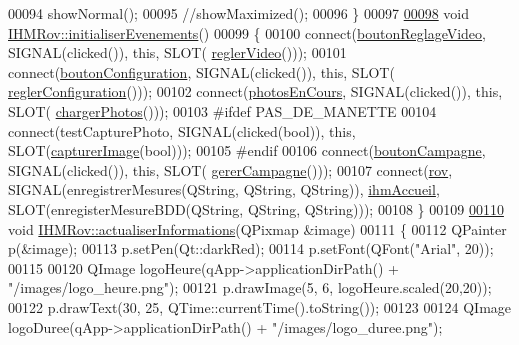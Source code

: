 \begin{DoxyCode}
00094     showNormal();
00095     \textcolor{comment}{//showMaximized();}
00096 \}
00097 
\hyperlink{class_i_h_m_rov_a61e34efc084bba9934bce0d91448ea04}{00098} \textcolor{keywordtype}{void} \hyperlink{class_i_h_m_rov_a61e34efc084bba9934bce0d91448ea04}{IHMRov::initialiserEvenements}()
00099 \{
00100     connect(\hyperlink{class_i_h_m_rov_a57cb3bea4f1f9149d730ccc5688581fc}{boutonReglageVideo}, SIGNAL(clicked()), \textcolor{keyword}{this}, SLOT(
      \hyperlink{class_i_h_m_rov_a68653dfe09dbb9695797d60e9190366b}{reglerVideo}()));
00101     connect(\hyperlink{class_i_h_m_rov_aea67721180bf155892a297b3c39309c5}{boutonConfiguration}, SIGNAL(clicked()), \textcolor{keyword}{this}, SLOT(
      \hyperlink{class_i_h_m_rov_a9b517b4891917634d64c903894bcc48b}{reglerConfiguration}()));
00102     connect(\hyperlink{class_i_h_m_rov_a0896dea1a2d901a7cf43a344e22fc66d}{photosEnCours}, SIGNAL(clicked()), \textcolor{keyword}{this}, SLOT(
      \hyperlink{class_i_h_m_rov_aae5c264f7a1b6d27c1d2e25574c88c5b}{chargerPhotos}()));
00103 \textcolor{preprocessor}{    #ifdef PAS\_DE\_MANETTE}
00104     connect(testCapturePhoto, SIGNAL(clicked(\textcolor{keywordtype}{bool})), \textcolor{keyword}{this}, SLOT(\hyperlink{class_i_h_m_rov_a15fe4fd090a0171bb9ad24e28d3b978a}{capturerImage}(\textcolor{keywordtype}{bool})));
00105 \textcolor{preprocessor}{    #endif}
00106     connect(\hyperlink{class_i_h_m_rov_a324be23537f48127c49b943aa439a978}{boutonCampagne}, SIGNAL(clicked()), \textcolor{keyword}{this}, SLOT(
      \hyperlink{class_i_h_m_rov_a3660d3b4bf61367534eae9d0c3618a5e}{gererCampagne}()));
00107     connect(\hyperlink{class_i_h_m_rov_a777ca33fdb295ba6b6773e880356fa1e}{rov}, SIGNAL(enregistrerMesures(QString, QString, QString)), 
      \hyperlink{class_i_h_m_rov_aa22f6fe8daf5c67071ec02a348e5cc3e}{ihmAccueil}, SLOT(enregisterMesureBDD(QString, QString, QString)));
00108 \}
00109 
\hyperlink{class_i_h_m_rov_a58ba3661c111c9ab2d6f1e3c52f4ec21}{00110} \textcolor{keywordtype}{void} \hyperlink{class_i_h_m_rov_a58ba3661c111c9ab2d6f1e3c52f4ec21}{IHMRov::actualiserInformations}(QPixmap &image)
00111 \{
00112     QPainter p(&image);
00113     p.setPen(Qt::darkRed);
00114     p.setFont(QFont(\textcolor{stringliteral}{"Arial"}, 20));
00115 
00120     QImage logoHeure(qApp->applicationDirPath() + \textcolor{stringliteral}{"/images/logo\_heure.png"});
00121     p.drawImage(5, 6, logoHeure.scaled(20,20));
00122     p.drawText(30, 25, QTime::currentTime().toString());
00123 
00124     QImage logoDuree(qApp->applicationDirPath() + \textcolor{stringliteral}{"/images/logo\_duree.png"});

\end{DoxyCode}
